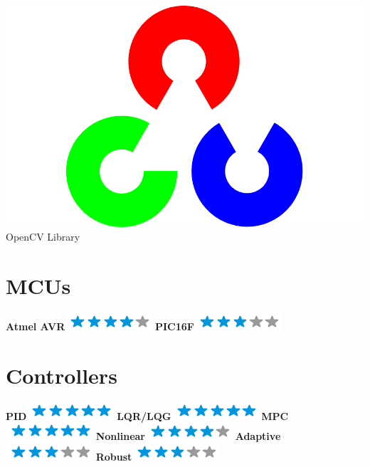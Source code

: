 \documentclass[]{friggeri-cv}
\begin{document}
\begin{aside}
     \includegraphics[scale=0.3]{img/Untitled.png} \\     OpenCV Library     
    ~
     \section{MCUs}
     \textbf{Atmel AVR}\includegraphics[scale=0.40]{img/4stars.png}
     \textbf{PIC16F}\includegraphics[scale=0.40]{img/3stars.png}
    ~
         \section{Controllers}
     \textbf{PID}\includegraphics[scale=0.40]{img/5stars.png}
     \textbf{\small LQR/LQG}\includegraphics[scale=0.40]{img/5stars.png}
       \textbf{\small MPC}\includegraphics[scale=0.40]{img/5stars.png}
              \textbf{\small Nonlinear}\includegraphics[scale=0.40]{img/4stars.png}
\textbf{\small Adaptive}\includegraphics[scale=0.40]{img/3stars.png}
                                   \textbf{\small Robust}\includegraphics[scale=0.40]{img/3stars.png}
    ~
   \end{aside}
\end{document}
